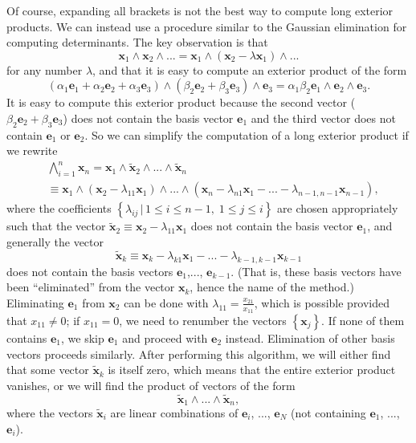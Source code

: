 Of course, expanding all brackets is not the best way to compute long
exterior products. We can instead use a procedure similar to the Gaussian
elimination for computing determinants.
The key observation is that\[
\mathbf{x}_{1}\wedge\mathbf{x}_{2}\wedge...=\mathbf{x}_{1}\wedge\left(\mathbf{x}_{2}-\lambda\mathbf{x}_{1}\right)\wedge...\]
for any number $\lambda$, and that it is easy to compute an exterior
product of the form\[
(\alpha_{1}\mathbf{e}_{1}+\alpha_{2}\mathbf{e}_{2}+\alpha_{3}\mathbf{e}_{3})\wedge(\beta_{2}\mathbf{e}_{2}+\beta_{3}\mathbf{e}_{3})\wedge\mathbf{e}_{3}=\alpha_{1}\beta_{2}\mathbf{e}_{1}\wedge\mathbf{e}_{2}\wedge\mathbf{e}_{3}.\]
It is easy to compute this exterior product because the second vector
($\beta_{2}\mathbf{e}_{2}+\beta_{3}\mathbf{e}_{3}$) does not contain
the basis vector $\mathbf{e}_{1}$ and the third vector does not contain
$\mathbf{e}_{1}$ or $\mathbf{e}_{2}$. So we can simplify the computation
of a long exterior product if we rewrite \begin{align*}
 & \bigwedge_{i=1}^{n}\mathbf{x}_{n}=\mathbf{x}_{1}\wedge\tilde{\mathbf{x}}_{2}\wedge...\wedge\tilde{\mathbf{x}}_{n}\\
 & \equiv\mathbf{x}_{1}\wedge(\mathbf{x}_{2}-\lambda_{11}\mathbf{x}_{1})\wedge...\wedge\left(\mathbf{x}_{n}-\lambda_{n1}\mathbf{x}_{1}-...-\lambda_{n-1,n-1}\mathbf{x}_{n-1}\right),\end{align*}
where the coefficients $\left\{ \lambda_{ij}\,|\,1\leq i\leq n-1,\;1\leq j\leq i\right\} $
are chosen appropriately such that the vector $\tilde{\mathbf{x}}_{2}\equiv\mathbf{x}_{2}-\lambda_{11}\mathbf{x}_{1}$
does not contain the basis vector $\mathbf{e}_{1}$, and generally
the vector \[
\tilde{\mathbf{x}}_{k}\equiv\mathbf{x}_{k}-\lambda_{k1}\mathbf{x}_{1}-...-\lambda_{k-1,k-1}\mathbf{x}_{k-1}\]
 does not contain the basis vectors $\mathbf{e}_{1}$,..., $\mathbf{e}_{k-1}$.
(That is, these basis vectors have been {}``eliminated'' from the
vector $\mathbf{x}_{k}$, hence the name of the method.) Eliminating
$\mathbf{e}_{1}$ from $\mathbf{x}_{2}$ can be done with $\lambda_{11}=\frac{x_{21}}{x_{11}}$,
which is possible provided that $x_{11}\neq0$; if $x_{11}=0$, we
need to renumber the vectors $\left\{ \mathbf{x}_{j}\right\} $. If
none of them contains $\mathbf{e}_{1}$, we skip $\mathbf{e}_{1}$
and proceed with $\mathbf{e}_{2}$ instead. Elimination of other basis
vectors proceeds similarly. After performing this algorithm, we will
either find that some vector $\tilde{\mathbf{x}}_{k}$ is itself zero,
which means that the entire exterior product vanishes, or we will
find the product of vectors of the form\[
\tilde{\mathbf{x}}_{1}\wedge...\wedge\tilde{\mathbf{x}}_{n},\]
 where the vectors $\tilde{\mathbf{x}}_{i}$ are linear combinations
of $\mathbf{e}_{i}$, ..., $\mathbf{e}{}_{N}$ (not containing $\mathbf{e}_{1}$,
..., $\mathbf{e}_{i}$). 


